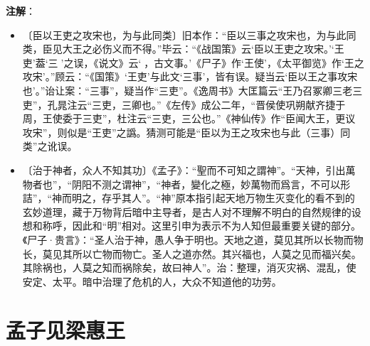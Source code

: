\documentclass[12pt,UTF-8,openany,a4]{ctexbook}
\begin{document}
\newpage

\begin{Large}
   \noindent \textbf{注解}：
\end{Large}

\vspace{-1em}

\begin{itemize}
    \setlength\itemsep{-0.2em}
    \item〔臣以王吏之攻宋也，为与此同类〕{\yiwen 旧本作：“臣以三事之攻宋也，为与此同类，臣见大王之必伤义而不得。”毕云：“《战国策》云‘臣以王吏之攻宋。’‘王吏’葢‘三𠭏’之误，《说文》云‘𠭏，古文事。’《尸子》作‘王使’，《太平御览》作‘王之攻宋’。”顾云：“《国策》‘王吏’与此文‘三事’，皆有误。疑当云‘臣以王之事攻宋也’。”诒让案：“三事”，疑当作“三吏”。《逸周书》大匡篇云“王乃召冢卿三老三吏”，孔晁注云“三吏，三卿也。”《左传》成公二年，“晋侯使巩朔献齐捷于周，王使委于三吏”，杜注云“三吏，三公也。”《神仙传》作“臣闻大王，更议攻宋”，则似是“王吏”之譌。猜测可能是“臣以为王之攻宋也与此（三事）同类”之讹误。}
    \item〔治于神者，众人不知其功〕{\yiwen 《孟子》：“聖而不可知之謂神”。“天神，引出萬物者也”，“阴阳不测之谓神”，“神者，變化之極，妙萬物而爲言，不可以形詰”，“神而明之，存乎其人”。“神”原本指引起天地万物生灭变化的看不到的玄妙道理，藏于万物背后暗中主导者，是古人对不理解不明白的自然规律的设想和称呼，因此和“明”相对。这里引申为表示不为人知但最重要关键的部分。《尸子·贵言》：“圣人治于神，愚人争于明也。天地之道，莫见其所以长物而物长，莫见其所以亡物而物亡。圣人之道亦然。其兴福也，人莫之见而福兴矣。其除祸也，人莫之知而祸除矣，故曰神人”。治：整理，消灭灾祸、混乱，使安定、太平。暗中治理了危机的人，大众不知道他的功劳。}
\end{itemize}


\chapter{孟子见梁惠王}
\end{document}
